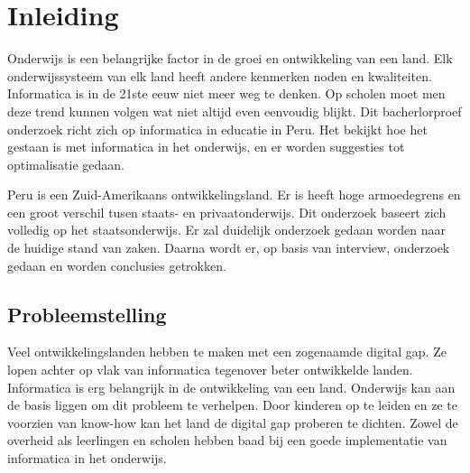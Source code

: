 \chapter{Inleiding}
\label{ch:inleiding}

Onderwijs is een belangrijke factor in de groei en ontwikkeling van een land. Elk onderwijssysteem van elk land heeft andere kenmerken noden en kwaliteiten. Informatica is in de 21ste eeuw niet meer weg te denken. Op scholen moet men deze trend kunnen volgen wat niet altijd even eenvoudig blijkt. Dit bacherlorproef onderzoek richt zich op informatica in educatie in Peru. Het bekijkt hoe het gestaan is met informatica in het onderwijs, en er worden suggesties tot optimalisatie gedaan.

Peru is een Zuid-Amerikaans ontwikkelingsland. Er is heeft hoge armoedegrens en een groot verschil tusen staats- en privaatonderwijs. Dit onderzoek baseert zich volledig op het staatsonderwijs. Er zal duidelijk onderzoek gedaan worden naar de huidige stand van zaken. Daarna wordt er, op basis van interview, onderzoek gedaan en worden conclusies getrokken.



\section{Probleemstelling}
\label{sec:probleemstelling}
Veel ontwikkelingslanden hebben te maken met een zogenaamde digital gap. Ze lopen achter op vlak van informatica tegenover beter ontwikkelde landen. Informatica is erg belangrijk in de ontwikkeling van een land.  Onderwijs kan aan de basis liggen om dit probleem te verhelpen. Door kinderen op te leiden en ze te voorzien van know-how kan het land de digital gap proberen te dichten. Zowel de overheid als leerlingen en scholen hebben baad bij een goede implementatie van informatica in het onderwijs. 

